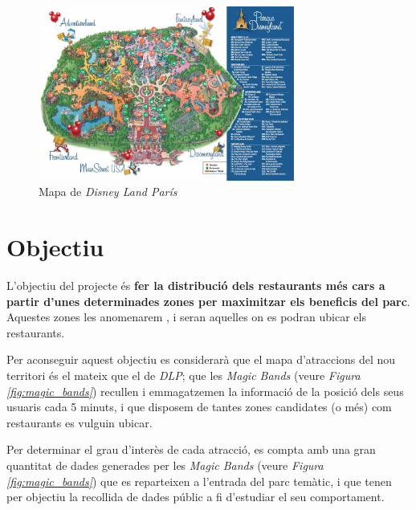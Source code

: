 \documentclass[12pt]{article}
\begin{document}
\begin{figure}[H]
    \centering
    \includegraphics[width=0.75\textwidth]{imatges/mapa_disney_land_paris.jpg}\par\vspace{1cm}
    \caption{Mapa de \textit{Disney Land París}}
    \label{fig:disney1}
\end{figure}

\clearpage
\section{Objectiu}
L'objectiu del projecte és \textbf{fer la distribució dels restaurants més cars a partir d'unes determinades zones  per maximitzar els beneficis del parc}. Aquestes zones les anomenarem , i seran aquelles on es podran ubicar els restaurants.

Per aconseguir aquest objectiu es considerarà que el mapa d'atraccions del nou territori és el mateix que el de \textit{DLP}; que les \textit{Magic Bands} (veure \textit{Figura \ref{fig:magic_bands}}) recullen i emmagatzemen la informació de la posició dels seus usuaris cada 5 minuts, i que disposem de tantes zones candidates (o més) com restaurants es vulguin ubicar. 

Per determinar el grau d'interès de cada atracció, es compta amb una gran quantitat de dades generades per les \textit{Magic Bands} (veure \textit{Figura \ref{fig:magic_bands}}) que es reparteixen a l'entrada del parc temàtic, i que tenen per objectiu la recollida de dades públic a fi d'estudiar el seu comportament. 
\end{document}
